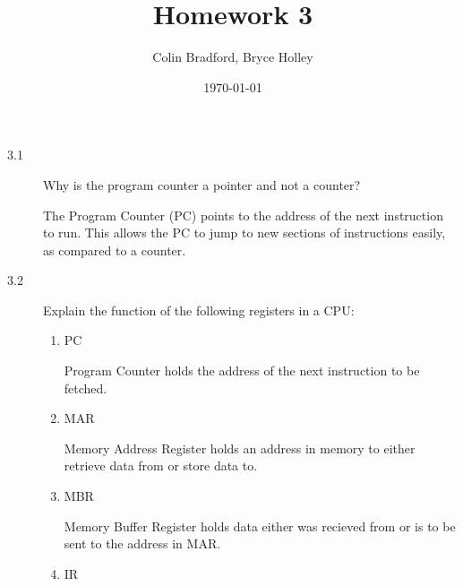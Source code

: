 \documentclass[letterpaper,10pt,titlepage]{article}
\def\name{Colin Bradford, Bryce Holley}
\begin{document}
\title{Homework 3}
\author{\name}
\date{\today}
\maketitle
\begin{description}
    \item[3.1] Why is the program counter a pointer and not a counter?
    
    The Program Counter (PC) points to the address of the next instruction to run. This allows the PC to jump to new sections of instructions easily, as compared to a counter.
    \item[3.2] Explain the function of the following registers in a CPU:
    \begin{enumerate}
        \item PC
        
        Program Counter holds the address of the next instruction to be fetched.
        \item MAR
        
        Memory Address Register holds an address in memory to either retrieve data from or store data to.
        \item MBR
        
        Memory Buffer Register holds data either was recieved from or is to be sent to the address in MAR.
        \item IR
        

\end{enumerate}
\end{description}
\end{document}
